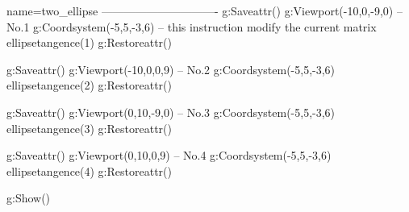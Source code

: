 \documentclass{standalone}
\begin{document}
\begin{luadraw}{name=two_ellipse}
        -------------------------------
        g:Saveattr()
        g:Viewport(-10,0,-9,0) -- No.1
        g:Coordsystem(-5,5,-3,6)  -- this instruction modify the current matrix
        ellipsetangence(1)
        g:Restoreattr()

        g:Saveattr()
        g:Viewport(-10,0,0,9) -- No.2
        g:Coordsystem(-5,5,-3,6)
        ellipsetangence(2)
        g:Restoreattr()

        g:Saveattr()
        g:Viewport(0,10,-9,0) -- No.3
        g:Coordsystem(-5,5,-3,6)
        ellipsetangence(3)
        g:Restoreattr()

        g:Saveattr()
        g:Viewport(0,10,0,9) -- No.4
        g:Coordsystem(-5,5,-3,6)
        ellipsetangence(4)
        g:Restoreattr()

        g:Show()
    \end{luadraw}
\end{document}
